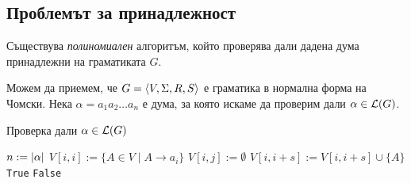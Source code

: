 

\subsection{Проблемът за принадлежност}

\begin{thm}
  Съществува {\em полиномиален} алгоритъм, който проверява дали дадена дума принадлежни на граматиката $G$.
\end{thm}
Можем да приемем, че $G = \langle{V,\Sigma,R,S}\rangle$ е граматика в нормална форма на Чомски.
Нека $\alpha = a_1a_2\dots a_n$ е дума, за която искаме да проверим дали $\alpha \in \mathcal{L}(G)$.
\begin{algorithm}[H]
  \caption{Проверка дали $\alpha \in \mathcal{L}(G)$}
  \label{alg:belongs-to-grammar}
  \begin{algorithmic}[1]
    \State $n := \lvert{\alpha}\rvert$ 
    \State $V[i,i] := \{A \in V \mid A\rightarrow a_i\}$
    \EndFor
    \State $V[i,j] := \emptyset$
    \EndFor      
    \ForAll{$s \in [1, n)$} 
    \ForAll{$k \in [i, i + s)$}
    \State $V[i,i+s] := V[i,i+s] \cup \{A\}$
    \EndIf
    \EndFor
    \EndFor
    \EndFor
    \State \Return \texttt{True}
    \Else
    \State \Return \texttt{False}
    \EndIf
  \end{algorithmic}
\end{algorithm}

